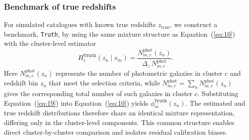 \subsubsection{Benchmark of true redshifts} \label{sec:2.2.4}

For simulated catalogues with known true redshifts \(z_\mathrm{true}\), we construct a benchmark, \texttt{Truth}, by using the same mixture structure as Equation~(\ref{eq:10}) with the cluster-level estimator
\begin{equation} \label{eq:19}
    H_c^\texttt{Truth}(z_n \mid s_m) = \frac{N_{m,c}^\mathrm{phot}(z_n)}{\Delta_z \, N_{m,c}^\mathrm{phot}}.
\end{equation}
Here \(N_{m,c}^\mathrm{phot}(z_n)\) represents the number of photometric galaxies in cluster \(c\) and redshift bin \(z_n\) that meet the selection criteria, while \(N_{m,c}^\mathrm{phot}=\sum_n N_{m,c}^\mathrm{phot}(z_n)\) gives the corresponding total number of such galaxies in cluster \(c\). Substituting Equation~(\ref{eq:19}) into Equation~(\ref{eq:10}) yields \(\phi_m^\texttt{Truth}(z_n)\). The estimated and true redshift distributions therefore share an identical mixture representation, differing only in the cluster-level components. This common structure enables direct cluster-by-cluster comparison and isolates residual calibration biases.